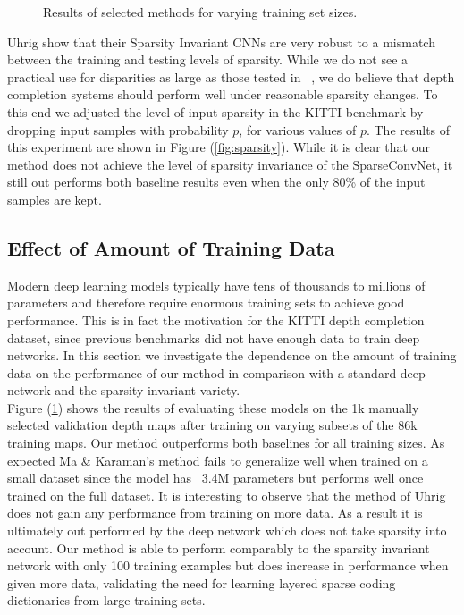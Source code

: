 \begin{figure}
\begin{minipage}{0.45\textwidth}
    \caption{Results of selected methods for varying training set sizes.}
    \label{fig:trainsize}
  \end{minipage}
\end{figure}

Uhrig \etal show that their Sparsity Invariant CNNs are very robust to a mismatch between the training and testing levels of sparsity. While we do not see a practical use for disparities as large as those tested in ~\cite{uhrig}, we do believe that depth completion systems should perform well under reasonable sparsity changes. To this end we adjusted the level of input sparsity in the KITTI benchmark by dropping input samples with probability $p$, for various values of $p$. The results of this experiment are shown in Figure (\ref{fig:sparsity}). While it is clear that our method does not achieve the level of sparsity invariance of the SparseConvNet, it still out performs both baseline results even when the only 80\% of the input samples are kept.
\subsection{Effect of Amount of Training Data}
\label{sec:effect-training-data}

Modern deep learning models typically have tens of thousands to millions of parameters and therefore require enormous training sets to achieve good performance. This is in fact the motivation for the KITTI depth completion dataset, since previous benchmarks did not have enough data to train deep networks. In this section we investigate the dependence on the amount of training data on the performance of our method in comparison with a standard deep network and the sparsity invariant variety.\\
Figure (\ref{fig:trainsize}) shows the results of evaluating these models on the 1k manually selected validation depth maps after training on varying subsets of the 86k training maps. Our method outperforms both baselines for all training sizes. As expected Ma \& Karaman's method fails to generalize well when trained on a small dataset since the model has ~3.4M parameters but performs well once trained on the full dataset. It is interesting to observe that the method of Uhrig \etal does not gain any performance from training on more data. As a result it is ultimately out performed by the deep network which does not take sparsity into account. Our method is able to perform comparably to the sparsity invariant network with only 100 training examples but does increase in performance when given more data, validating the need for learning layered sparse coding dictionaries from large training sets. 
